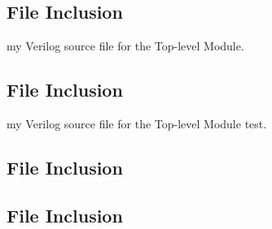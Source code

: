 \documentclass[11pt]{article}
\newcommand{\Verilog}[2][]{%
	
}
\begin{document}
\subsection*{File Inclusion}
\Verilog[caption=Seven-segment Decoder Test Benches Verilog code,label=code:file_ex]{sseg_decoder_test.sv}

my Verilog source file for the Top-level Module.\\
\subsection*{File Inclusion}
\Verilog[caption=Top-level Module Verilog code,label=code:file_ex]{sseg1.sv}
my Verilog source file for the Top-level Module test.\\
\subsection*{File Inclusion}
\Verilog[caption=Top-level Module Test Benches Verilog code,label=code:file_ex]{sseg1_test.sv}


\subsection*{File Inclusion}
\Verilog[caption=Two Bit Adder/Aubtractor Verilog code,label=code:file_ex]{sseg1_wrapper.sv}
\end{document}
